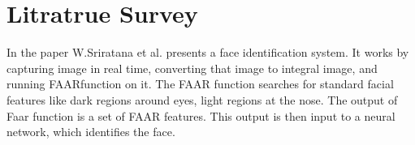 \section{Litratrue Survey}
In the paper \cite{opencv} W.Sriratana et al. presents a face identification system. It works by capturing image in real time, converting that image to integral image,
and running FAARfunction on it. The FAAR function searches for standard facial features like dark regions around eyes, light regions at the nose. The output of Faar function
is a set of FAAR features. This output is then input to a neural network, which identifies the face.


